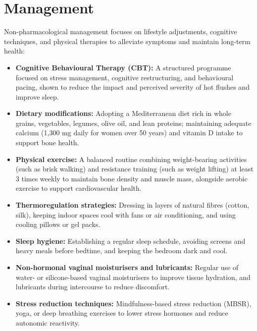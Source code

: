 \section*{Management}
Non-pharmacological management focuses on lifestyle adjustments, cognitive techniques, and physical therapies to alleviate symptoms and maintain long-term health:
\begin{itemize}
    \item \textbf{Cognitive Behavioural Therapy (CBT):} A structured programme focused on stress management, cognitive restructuring, and behavioural pacing, shown to reduce the impact and perceived severity of hot flushes and improve sleep.
    \item \textbf{Dietary modifications:} Adopting a Mediterranean diet rich in whole grains, vegetables, legumes, olive oil, and lean proteins; maintaining adequate calcium (1,300 mg daily for women over 50 years) and vitamin D intake to support bone health.
    \item \textbf{Physical exercise:} A balanced routine combining weight-bearing activities (such as brisk walking) and resistance training (such as weight lifting) at least 3 times weekly to maintain bone density and muscle mass, alongside aerobic exercise to support cardiovascular health.
    \item \textbf{Thermoregulation strategies:} Dressing in layers of natural fibres (cotton, silk), keeping indoor spaces cool with fans or air conditioning, and using cooling pillows or gel packs.
    \item \textbf{Sleep hygiene:} Establishing a regular sleep schedule, avoiding screens and heavy meals before bedtime, and keeping the bedroom dark and cool.
    \item \textbf{Non-hormonal vaginal moisturisers and lubricants:} Regular use of water- or silicone-based vaginal moisturisers to improve tissue hydration, and lubricants during intercourse to reduce discomfort.
    \item \textbf{Stress reduction techniques:} Mindfulness-based stress reduction (MBSR), yoga, or deep breathing exercises to lower stress hormones and reduce autonomic reactivity.
\end{itemize}

